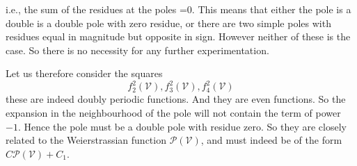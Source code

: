 \begin{figure}[H]
\end{figure}
i.e., the sum of the residues at the poles =0. This means that either
the pole is a double is a double pole with zero residue, or there are
two simple poles with residues equal in magnitude but opposite in
sign. However neither of these is the case. So there is no necessity
for any further experimentation. 

Let us therefore consider the squares
$$
f^2_2 (\mathscr{V}), f_3^2 (\mathscr{V}), f_4^2 (\mathscr{V})
$$
these are indeed doubly periodic functions. And they are even
functions. So the expansion in the neighbourhood of the pole will not
contain the term of power $-1$. Hence the pole must be a double pole
with residue zero. So they are closely related to the Weierstrassian
function $\mathscr{P}(\mathscr{V})$, and must indeed be of the form $C
\mathscr{P}(\mathscr{V})+C_1$.

